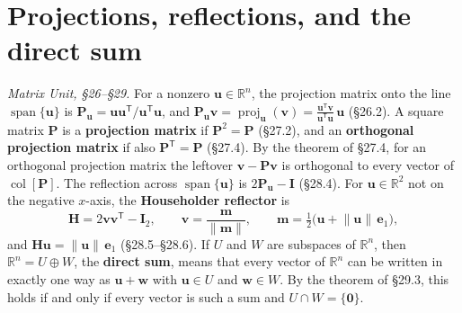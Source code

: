\documentclass[11pt]{article}
\newcommand{\R}{\mathbb{R}}
\newcommand{\vc}[1]{\mathbf{#1}}
\newcommand{\mt}[1]{\mathbf{#1}}          %
\newcommand{\T}{^{\mathsf{T}}}            %
\newcommand{\norm}[1]{\lVert #1\rVert}
\newcommand{\proj}[2]{\operatorname{proj}_{#1}(#2)}
\newcommand{\colsp}[1]{\operatorname{col}[#1]}
\DeclareMathOperator{\spanop}{span}
\begin{document}
\section{Projections, reflections, and the direct sum}
\emph{Matrix Unit, \S26--\S29.} For a nonzero $\vc{u}\in\R^{n}$, the projection
matrix onto the line $\spanop\{\vc{u}\}$ is
$\mt{P}_{\vc{u}}=\vc{u}\vc{u}\T/\vc{u}\T\vc{u}$, and
$\mt{P}_{\vc{u}}\vc{v}=\proj{\vc{u}}{\vc{v}}=\frac{\vc{u}\T\vc{v}}{\vc{u}\T\vc{u}}\,\vc{u}$
(\S26.2). A square matrix $\mt{P}$ is a \textbf{projection matrix} if
$\mt{P}^{2}=\mt{P}$ (\S27.2), and an \textbf{orthogonal projection matrix} if
also $\mt{P}\T=\mt{P}$ (\S27.4). By the theorem of \S27.4, for an orthogonal
projection matrix the leftover $\vc{v}-\mt{P}\vc{v}$ is orthogonal to every
vector of $\colsp{\mt{P}}$. The reflection across $\spanop\{\vc{u}\}$ is
$2\mt{P}_{\vc{u}}-\mt{I}$ (\S28.4). For $\vc{u}\in\R^{2}$ not on the negative
$x$-axis, the \textbf{Householder reflector} is
\[
  \mt{H}=2\vc{v}\vc{v}\T-\mt{I}_2,
  \qquad
  \vc{v}=\frac{\vc{m}}{\norm{\vc{m}}},
  \qquad
  \vc{m}=\tfrac12\bigl(\vc{u}+\norm{\vc{u}}\,\vc{e}_1\bigr),
\]
and $\mt{H}\vc{u}=\norm{\vc{u}}\,\vc{e}_1$ (\S28.5--\S28.6). If $U$ and $W$ are
subspaces of $\R^{n}$, then $\R^{n}=U\oplus W$, the \textbf{direct sum}, means
that every vector of $\R^{n}$ can be written in exactly one way as
$\vc{u}+\vc{w}$ with $\vc{u}\in U$ and $\vc{w}\in W$. By the theorem of
\S29.3, this holds if and only if every vector is such a sum and
$U\cap W=\{\vc{0}\}$.
\end{document}
